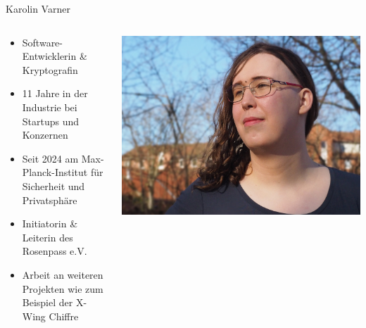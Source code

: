 \begin{frame}{Karolin Varner}
  \begin{columns}[fullwidth,c]

    \begin{column}{.7\linewidth}
      \begin{itemize}
        \item Software-Entwicklerin \& Kryptografin
        \item 11 Jahre in der Industrie bei Startups und Konzernen
        \item Seit 2024 am Max-Planck-Institut für Sicherheit und Privatsphäre
        \item Initiatorin \& Leiterin des Rosenpass e.V.
        \item Arbeit an weiteren Projekten wie zum Beispiel der X-Wing Chiffre
      \end{itemize}
    \end{column}%
    \begin{column}{.3\linewidth}
      \includegraphics[width=.92\linewidth,trim=200 0 100 0,clip]{graphics/karolin-varner.jpg}
    \end{column}
  \end{columns}
\end{frame}

